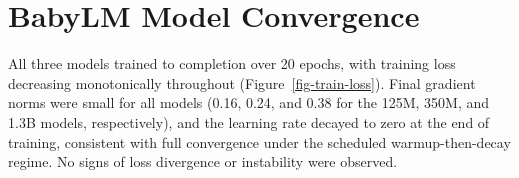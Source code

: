 \documentclass[11pt]{article}
\begin{document}
\begin{table}[H]


\caption{\label{tbl-hyperparams}Hyperparameters for the three BabyLM
models. All models share a BPE tokenizer (vocabulary size 8,192) trained
on the BabyLM corpus. Training used two NVIDIA A100 80GB GPUs with
distributed data parallelism.}

\end{table}%

\clearpage

\section{BabyLM Model Convergence}\label{babylm-model-convergence}

All three models trained to completion over 20 epochs, with training
loss decreasing monotonically throughout (Figure~\ref{fig-train-loss}).
Final gradient norms were small for all models (0.16, 0.24, and 0.38 for
the 125M, 350M, and 1.3B models, respectively), and the learning rate
decayed to zero at the end of training, consistent with full convergence
under the scheduled warmup-then-decay regime. No signs of loss
divergence or instability were observed.
\end{document}
